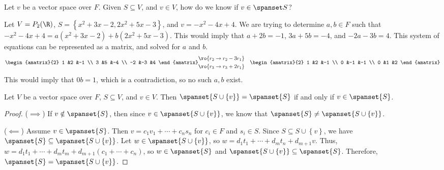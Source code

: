 \documentclass[12pt]{article}
\begin{document}
\begin{exmp}
    Let $v$ be a vector space over $F$. Given $S \subseteq V$, and $v \in V$, how do we know if $v \in \spanset S$?

    Let $V = P_2(\R)$, $S = \left\{x^2 + 3x - 2, 2x^2 + 5x -3\right\}$, and $v = -x^2 - 4x + 4$. We are trying to determine $a, b \in F$ such that $-x^2 - 4x + 4 = a(x^2 + 3x - 2) + b(2x^2 + 5x - 3)$. This would imply that $a + 2b = -1$, $3a + 5b = -4$, and $-2a - 3b = 4$. This system of equations can be represented as a matrix, and solved for $a$ and $b$.
    \begin{align*}
        \begin{amatrix}{2}
            1 &2 &-1 \\
            3 &5 &-4 \\
            -2 &-3 &4
        \end{amatrix}
         & \begin{aligned}
             & \ro{r_2 \rightarrow r_2 - 3r_1}  \\
             & \ro{r_3 \rightarrow r_3 + 2r_1} \\
        \end{aligned}
         & \begin{amatrix}{2}
            1 &2 &-1 \\
            0 &-1 &-1 \\
            0 &1 &2
        \end{amatrix}
    \end{align*}
    This would imply that $0b = 1$, which is a contradiction, so no such $a, b$ exist.
\end{exmp}

\begin{lemma}\label{equal-spans-condition}
    Let $V$ be a vector space over $F$, $S \subseteq V$, and $v \in V$. Then $\spanset{S \cup \left\{v\right\}} = \spanset{S}$ if and only if $v \in \spanset{S}$.
\end{lemma}

\begin{proof}\proofbreak
    ($\implies$) If $v \notin \spanset{S}$, then since $v \in \spanset{S \cup \left\{v\right\}}$, we know that $\spanset{S} \neq \spanset{S \cup \left\{v\right\}}$.

    ($\impliedby$) Assume $v \in \spanset{S}$. Then $v = c_1v_1 + \cdots + c_ns_n$ for $c_i \in F$ and $s_i \in S$. Since $S \subseteq S \cup \left\{v\right\}$, we have $\spanset{S} \subseteq \spanset{S \cup \left\{v\right\}}$. Let $w \in \spanset{S \cup \left\{v\right\}}$, so $w = d_1t_1 + \cdots + d_mt_n + d_{m+1}v$. Thus, $w = d_1t_1 + \cdots + d_mt_m + d_{m+1}(c_1 + \cdots + c_n)$, so $w \in \spanset{S}$ and $\spanset{S \cup \left\{v\right\}} \subseteq \spanset{S}$. Therefore, $\spanset{S} = \spanset{S \cup \left\{v\right\}}$.
\end{proof}
\end{document}
